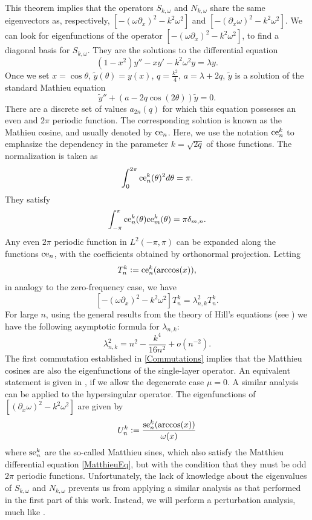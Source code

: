 \documentclass[a4paper]{article}
\begin{document}
	This theorem implies that the operators $S_{k,\omega}$ and $N_{k,\omega}$ share the same eigenvectors as, respectively, $\left[-(\omega \partial_x)^2 - k^2\omega^2\right]$ and $ \left[-(\partial_x \omega)^2 - k^2\omega^2\right]$. We can look for eigenfunctions of the operator $\left[ -(\omega \partial_x)^2 - k^2\omega^2\right]$, to find a diagonal basis for $S_{k,\omega}$. They are the solutions to the differential equation 
	\[ (1-x^2) y'' - x y' - k^2 \omega^2 y = \lambda y.\]
	Once we set $x = \cos \theta$, $\tilde{y}(\theta) = y(x)$,  $q = \frac{k^2}{4}$, $a = \lambda + 2q$, $\tilde{y}$ is a solution of the standard Mathieu equation 
	\begin{equation}
	\label{MatthieuEq}
		\tilde{y}'' + (a - 2q \cos(2\theta)) \tilde{y} = 0.
	\end{equation}
	There are a discrete set of values $a_{2n}(q)$ for which this equation possesses an even and $2\pi$ periodic function. The corresponding solution is known as the Mathieu cosine, and usually denoted by $\textup{ce}_n$. Here, we use the notation $\textup{ce}^k_n$ to emphasize the dependency in the parameter $k = \sqrt{2q}$ of those functions. The normalization is taken as
	\[ \int_{0}^{2\pi} \textup{ce}^k_n(\theta)^2 d\theta = \pi.\]
 	They satisfy
	\[ \int_{-\pi}^{\pi}\textup{ce}^k_n(\theta) \textup{ce}^k_m(\theta) = \pi \delta_{m,n}.\]
	Any even $2\pi$ periodic function in $L^2(-\pi,\pi)$ can be expanded along the functions $\textup{ce}_n$, with the coefficients obtained by orthonormal projection. Letting 
	\[T_{n}^k \mathrel{\mathop:}= \textup{ce}^k_n(\arccos(x)),\]
	in analogy to the zero-frequency case, we have
	\[\left[-(\omega \partial_x)^2 - k^2\omega^2\right] T_{n}^k = \lambda_{n,k}^2 T_{n}^k.\]
	For large $n$, using the general results from the theory of Hill's equations (see \cite[eq. 28.29.21]{NIST:DLMF}) we have the following asymptotic formula for $\lambda_{n,k}$:
	\[ \lambda_{n,k}^2 = n^2 - \frac{k^4}{16n^2} +o \left(n^{-2}\right). \]
	The first commutation established in \autoref{Commutations} implies that the Matthieu cosines are also the eigenfunctions of the single-layer operator. An equivalent statement is given in \cite[Thm 4.2]{betcke2014spectral}, if we allow the degenerate case $\mu = 0$. 
	A similar analysis can be applied to the hypersingular operator. The eigenfunctions of $\left[(\partial_x \omega)^2 - k^2 \omega^2\right]$ are given by 
	\[U_n^k \mathrel{\mathop:}= \frac{\textup{se}_n^k(\arccos(x))}{\omega(x)}\]
	where $\textup{se}_n^k$ are the so-called Matthieu sines, which also satisfy the Matthieu differential equation \eqref{MatthieuEq}, but with the condition that they must be odd $2\pi$ periodic functions. 
	Unfortunately, the lack of knowledge about the eigenvalues of $S_{k,\omega}$ and $N_{k,\omega}$ prevents us from applying a similar analysis as that performed in the first part of this work. Instead, we will perform a perturbation analysis, much like \cite{bruno2012second}.
	
\end{document}
